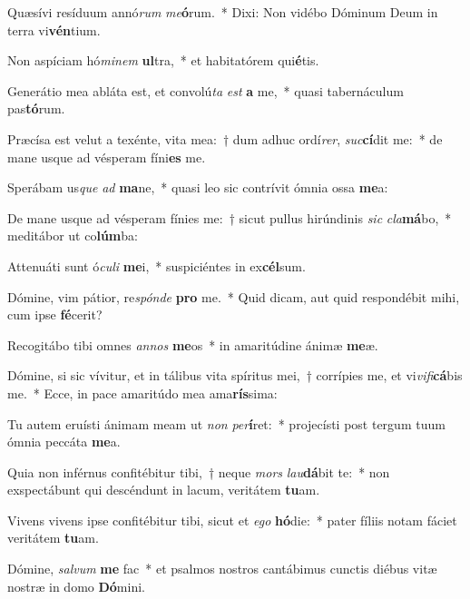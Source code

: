 \item Quæsívi resíduum annó\textit{rum} \textit{me}\textbf{ó}rum.~* Dixi: Non vidébo Dóminum Deum in terra vi\textbf{vén}tium.
\item Non aspíciam hó\textit{mi}\textit{nem} \textbf{ul}tra,~* et habitatórem qui\textbf{é}tis.
\item Generátio mea abláta est, et convolú\textit{ta} \textit{est} \textbf{a} me,~* quasi tabernáculum pas\textbf{tó}rum.
\item Præcísa est velut a texénte, vita mea:~† dum adhuc ordí\textit{rer}, \textit{suc}\textbf{cí}dit me:~* de mane usque ad vésperam fíni\textbf{es} me.
\item Sperábam us\textit{que} \textit{ad} \textbf{ma}ne,~* quasi leo sic contrívit ómnia ossa \textbf{me}a:
\item De mane usque ad vésperam fínies me:~† sicut pullus hirúndinis \textit{sic} \textit{cla}\textbf{má}bo,~* meditábor ut co\textbf{lúm}ba:
\item Attenuáti sunt ó\textit{cu}\textit{li} \textbf{me}i,~* suspiciéntes in ex\textbf{cél}sum.
\item Dómine, vim pátior, re\textit{spón}\textit{de} \textbf{pro} me.~* Quid dicam, aut quid respondébit mihi, cum ipse \textbf{fé}cerit?
\item Recogitábo tibi omnes \textit{an}\textit{nos} \textbf{me}os~* in amaritúdine ánimæ \textbf{me}æ.
\item Dómine, si sic vívitur, et in tálibus vita spíritus mei,~† corrípies me, et vi\textit{vi}\textit{fi}\textbf{cá}bis me.~* Ecce, in pace amaritúdo mea ama\textbf{rís}sima:
\item Tu autem eruísti ánimam meam ut \textit{non} \textit{per}\textbf{í}ret:~* projecísti post tergum tuum ómnia peccáta \textbf{me}a.
\item Quia non inférnus confitébitur tibi,~† neque \textit{mors} \textit{lau}\textbf{dá}bit te:~* non exspectábunt qui descéndunt in lacum, veritátem \textbf{tu}am.
\item Vivens vivens ipse confitébitur tibi, sicut et \textit{e}\textit{go} \textbf{hó}die:~* pater fíliis notam fáciet veritátem \textbf{tu}am.
\item Dómine, \textit{sal}\textit{vum} \textbf{me} fac~* et psalmos nostros cantábimus cunctis diébus vitæ nostræ in domo \textbf{Dó}mini.
